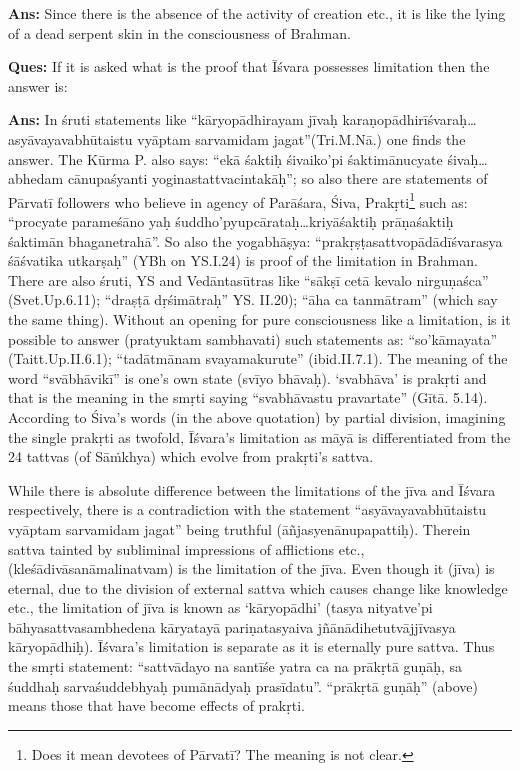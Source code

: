 \textbf{Ans:} Since there is the absence of the activity of creation etc., it is like the lying of a dead serpent skin in the consciousness of Brahman.

\textbf{Ques:} If it is asked what is the proof that Īśvara possesses limitation then the answer is: 

\textbf{Ans:} In śruti statements like “kāryopādhirayam jīvaḥ karaṇopādhirīśvaraḥ…asyāvayavabhūtaistu vyāptam sarvamidam jagat”(Tri.M.Nā.\-) one finds the answer. The Kūrma P. also says: “ekā śaktiḥ śivaiko’pi śaktimānucyate śivaḥ…abhedam cānupaśyanti yoginastattvacintakāḥ”; so also there are statements of Pārvatī followers who believe in agency of Parāśara, Śiva, Prakṛti\footnote{Does it mean devotees of Pārvatī? The meaning is not clear.} such as: “procyate parameśāno yaḥ śuddho’pyupcārataḥ…kriyāśaktiḥ prāṇaśaktiḥ śaktimān bhaganetrahā”.  So also the yogabhāṣya: “prakṛṣṭasattvopādādīśvarasya śāśvatika utkarṣaḥ” (YBh on YS.I.24) is proof of the limitation in Brahman. There are also śruti, YS and Vedāntasūtras like “sākṣī cetā kevalo nirguṇaśca” (Svet.Up.6.11); “draṣṭā dṛśimātraḥ” YS. II.20); ``āha ca tanmātram” (which say the same thing). Without an opening for pure consciousness like a limitation, is it possible to answer (pratyuktam sambhavati) such statements as: “so’kāmayata” (Taitt.Up.II.6.1); “tadātmānam svayamakurute” (ibid.II.7.1). The meaning of the word “svābhāvikī” is one’s own state (svīyo bhāvaḥ). ‘svabhāva’ is prakṛti and that is the meaning in the smṛti saying “svabhāvastu pravartate” (Gītā. 5.14).  According to Śiva’s words (in the above quotation) by partial division, imagining the single prakṛti as twofold, Īśvara’s limitation as māyā is differentiated from the 24 tattvas (of Sāṁkhya) which evolve from prakṛti’s sattva.

While there is absolute difference between the limitations of the jīva and Īśvara respectively, there is a contradiction with the statement “asyāvayavabhūtaistu vyāptam sarvamidam jagat” being truthful (āñjasyenā\-nupapattiḥ). Therein sattva tainted by subliminal impressions of afflictions etc.,(kleśādivāsanāmalinatvam) is the limitation of the jīva. Even though it (jīva) is eternal, due to the division of external sattva which causes change like knowledge etc., the limitation of jīva is known as ‘kāryopādhi’ (tasya nityatve’pi bāhyasattvasambhedena kāryatayā pariṇatasyaiva jñānādihetutvājjīvasya kāryopādhiḥ). Īśvara’s limitation is separate as it is eternally pure sattva. Thus the smṛti statement: “sattvādayo na santīśe yatra ca na prākṛtā guṇāḥ, sa śuddhaḥ sarvaśuddebhyaḥ pumānādyaḥ prasīdatu”. “prākṛtā guṇāḥ” (above) means those that have become effects of prakṛti. 

